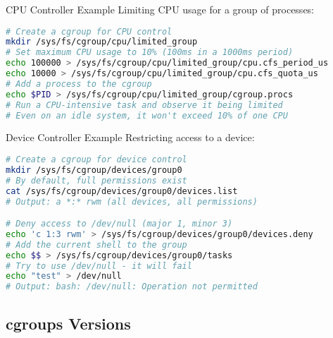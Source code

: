 \multend

\begin{example2}{CPU Controller Example}
    Limiting CPU usage for a group of processes:
    
\begin{lstlisting}[language=bash, style=basesmol]
# Create a cgroup for CPU control
mkdir /sys/fs/cgroup/cpu/limited_group
# Set maximum CPU usage to 10% (100ms in a 1000ms period)
echo 100000 > /sys/fs/cgroup/cpu/limited_group/cpu.cfs_period_us
echo 10000 > /sys/fs/cgroup/cpu/limited_group/cpu.cfs_quota_us
# Add a process to the cgroup
echo $PID > /sys/fs/cgroup/cpu/limited_group/cgroup.procs
# Run a CPU-intensive task and observe it being limited
# Even on an idle system, it won't exceed 10% of one CPU
\end{lstlisting}
\end{example2}

\begin{example2}{Device Controller Example}
    Restricting access to a device:
    
\begin{lstlisting}[language=bash, style=basesmol]
# Create a cgroup for device control
mkdir /sys/fs/cgroup/devices/group0
# By default, full permissions exist
cat /sys/fs/cgroup/devices/group0/devices.list
# Output: a *:* rwm (all devices, all permissions)

# Deny access to /dev/null (major 1, minor 3)
echo 'c 1:3 rwm' > /sys/fs/cgroup/devices/group0/devices.deny
# Add the current shell to the group
echo $$ > /sys/fs/cgroup/devices/group0/tasks
# Try to use /dev/null - it will fail
echo "test" > /dev/null
# Output: bash: /dev/null: Operation not permitted
\end{lstlisting}
\end{example2}

\subsection{cgroups Versions}

